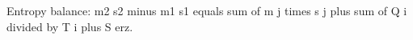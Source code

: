 Entropy balance:  
m2 s2 minus m1 s1 equals sum of m j times s j plus sum of Q i divided by T i plus S erz.